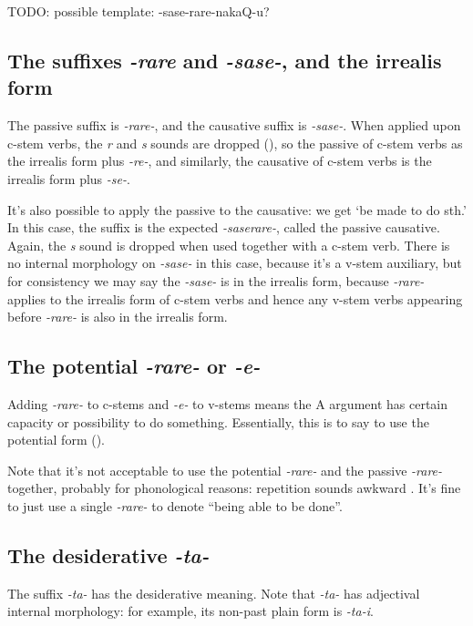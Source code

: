 \documentclass[UTF8, a4paper, oneside, scheme=plain]{ctexrep}
\newcommand{\corpus}[1]{\emph{#1}}
\newcommand{\translate}[1]{`#1'}
\begin{document}
TODO: possible template: -sase-rare-nakaQ-u?

\subsection{The suffixes \corpus{-rare} and \corpus{-sase-}, and the irrealis form}\label{sec:valency-irrealis}

The passive suffix is \corpus{-rare-},
and the causative suffix is \corpus{-sase-}.
When applied upon c-stem verbs,
the \corpus{r} and \corpus{s} sounds are dropped (),
so the passive of c-stem verbs as the irrealis form plus \corpus{-re-},
and similarly,
the causative of c-stem verbs is the irrealis form plus \corpus{-se-}.

It's also possible to apply the passive to the causative:
we get \translate{be made to do sth.}
In this case, the suffix is the expected 
\corpus{-saserare-},
called the passive causative.
Again, the \corpus{s} sound is dropped when used together with a c-stem verb.
There is no internal morphology on \corpus{-sase-} in this case,
because it's a v-stem auxiliary, but for consistency we may say
the \corpus{-sase-} is in the irrealis form,
because \corpus{-rare-} applies to the irrealis form of c-stem verbs 
and hence any v-stem verbs appearing before \corpus{-rare-} is also in the irrealis form.

\subsection{The potential \corpus{-rare-} or \corpus{-e-}}\label{sec:be-able-to-do}

Adding \corpus{-rare-} to c-stems and \corpus{-e-} to v-stems 
means the A argument has certain capacity or possibility to do something.
Essentially, this is to say to use the potential form ().

Note that it's not acceptable to use the potential \corpus{-rare-} and the passive \corpus{-rare-} together,
probably for phonological reasons: repetition sounds awkward \citep{kuno1978japanese}.
It's fine to just use a single \corpus{-rare-} to denote ``being able to be done''.

\subsection{The desiderative \corpus{-ta-}}

The suffix \corpus{-ta-} has the desiderative meaning.
Note that \corpus{-ta-} has adjectival internal morphology:
for example, its non-past plain form is \corpus{-ta-i}.
\end{document}
